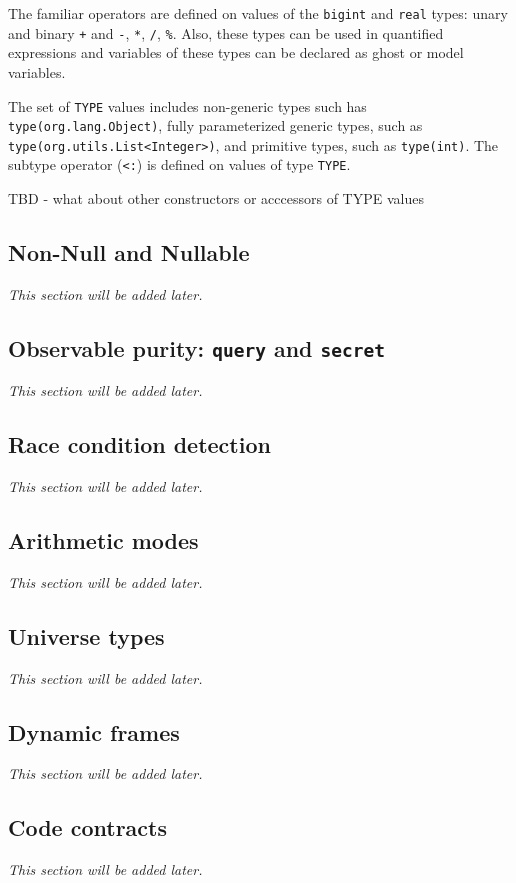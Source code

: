 The familiar operators are defined on values of the \texttt{\bs bigint} and \texttt{\bs real} types: unary and binary \texttt{+} and \texttt{-}, \texttt{*}, \texttt{/}, \texttt{\%}. Also, these types can be used in quantified expressions and variables of these types
can be declared as ghost or model variables.
  
The set of \texttt{\bs TYPE} values includes non-generic types such has \texttt{\bs type(org.lang.Object)}, fully parameterized generic types, such as \texttt{\bs type(org.utils.List<Integer>)}, and primitive types, such as \texttt{\bs type(int)}. 
The subtype operator (\texttt{<:}) is defined on values of type \texttt{\bs TYPE}.

TBD - what about other constructors or acccessors of TYPE values 


\subsection{Non-Null and Nullable}
\textit{This section will be added later.} %

\subsection{Observable purity: \texttt{\bs query} and \texttt{\bs secret}}
\textit{This section will be added later.} %

\subsection{Race condition detection}
\textit{This section will be added later.} %

\subsection{Arithmetic modes}
\textit{This section will be added later.} %

\subsection{Universe types}
\textit{This section will be added later.} %

\subsection{Dynamic frames}
\textit{This section will be added later.} %

\subsection{Code contracts}
\textit{This section will be added later.} %

